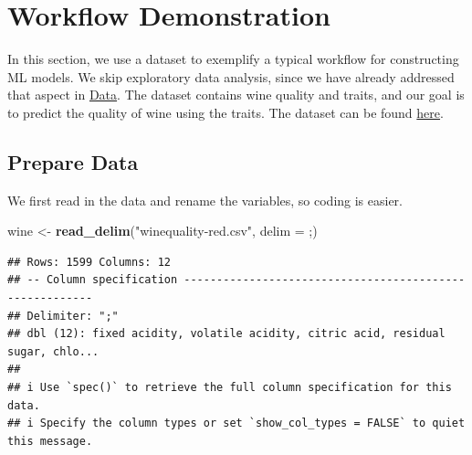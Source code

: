 \documentclass[
]{book}
\newenvironment{Shaded}{\begin{snugshade}}{\end{snugshade}}
\newcommand{\AttributeTok}[1]{\textcolor[rgb]{0.13,0.29,0.53}{#1}}
\newcommand{\ConstantTok}[1]{\textcolor[rgb]{0.56,0.35,0.01}{#1}}
\newcommand{\FunctionTok}[1]{\textcolor[rgb]{0.13,0.29,0.53}{\textbf{#1}}}
\newcommand{\NormalTok}[1]{#1}
\newcommand{\OtherTok}[1]{\textcolor[rgb]{0.56,0.35,0.01}{#1}}
\newcommand{\SpecialCharTok}[1]{\textcolor[rgb]{0.81,0.36,0.00}{\textbf{#1}}}
\newcommand{\StringTok}[1]{\textcolor[rgb]{0.31,0.60,0.02}{#1}}
\begin{document}
\hypertarget{workflow-demonstration}{%
\chapter{Workflow Demonstration}\label{workflow-demonstration}}

In this section, we use a dataset to exemplify a typical workflow for constructing ML models. We skip exploratory data analysis, since we have already addressed that aspect in \protect\hyperlink{data}{Data}. The dataset contains wine quality and traits, and our goal is to predict the quality of wine using the traits. The dataset can be found \href{https://www.kaggle.com/datasets/yasserh/wine-quality-dataset}{here}.

\begin{Shaded}
\end{Shaded}

\hypertarget{prepare-data}{%
\section{Prepare Data}\label{prepare-data}}

We first read in the data and rename the variables, so coding is easier.

\begin{Shaded}
\begin{Highlighting}[]
\NormalTok{wine }\OtherTok{\textless{}{-}} \FunctionTok{read\_delim}\NormalTok{(}\StringTok{"winequality{-}red.csv"}\NormalTok{, }\AttributeTok{delim =} \StringTok{\textquotesingle{};\textquotesingle{}}\NormalTok{)}
\end{Highlighting}
\end{Shaded}

\begin{verbatim}
## Rows: 1599 Columns: 12
## -- Column specification --------------------------------------------------------
## Delimiter: ";"
## dbl (12): fixed acidity, volatile acidity, citric acid, residual sugar, chlo...
## 
## i Use `spec()` to retrieve the full column specification for this data.
## i Specify the column types or set `show_col_types = FALSE` to quiet this message.
\end{verbatim}
\end{document}
